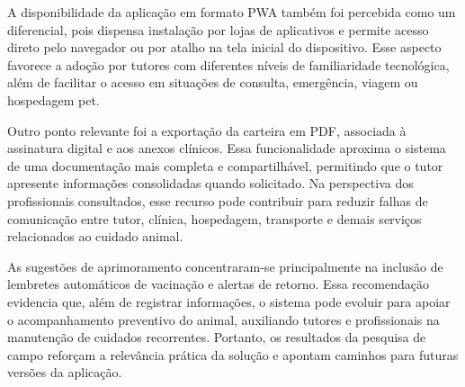 A disponibilidade da aplicação em formato PWA também foi percebida como um diferencial, pois dispensa instalação por lojas de aplicativos e permite acesso direto pelo navegador ou por atalho na tela inicial do dispositivo. Esse aspecto favorece a adoção por tutores com diferentes níveis de familiaridade tecnológica, além de facilitar o acesso em situações de consulta, emergência, viagem ou hospedagem pet.

Outro ponto relevante foi a exportação da carteira em PDF, associada à assinatura digital e aos anexos clínicos. Essa funcionalidade aproxima o sistema de uma documentação mais completa e compartilhável, permitindo que o tutor apresente informações consolidadas quando solicitado. Na perspectiva dos profissionais consultados, esse recurso pode contribuir para reduzir falhas de comunicação entre tutor, clínica, hospedagem, transporte e demais serviços relacionados ao cuidado animal.

As sugestões de aprimoramento concentraram-se principalmente na inclusão de lembretes automáticos de vacinação e alertas de retorno. Essa recomendação evidencia que, além de registrar informações, o sistema pode evoluir para apoiar o acompanhamento preventivo do animal, auxiliando tutores e profissionais na manutenção de cuidados recorrentes. Portanto, os resultados da pesquisa de campo reforçam a relevância prática da solução e apontam caminhos para futuras versões da aplicação.

\endgroup
